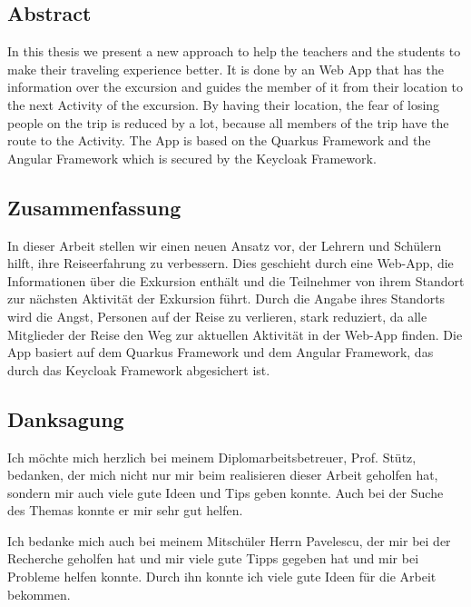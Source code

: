 \begin{spacing}{1}
    \chapter*{Abstract}
\end{spacing}
In this thesis we present a new approach to help the teachers and the students to make their traveling experience better. It is done by an Web App that has the information over the excursion and guides the member of it from their location to the next Activity of the excursion. By having their location, the fear of losing people on the trip is reduced by a lot, because all members of the trip have the route to the Activity. The App is based on the Quarkus Framework and the Angular Framework which is secured by the Keycloak Framework.  


\newpage
\begin{spacing}{1}
    \chapter*{Zusammenfassung}
\end{spacing}
In dieser Arbeit stellen wir einen neuen Ansatz vor, der Lehrern und Schülern hilft, ihre Reiseerfahrung zu verbessern. Dies geschieht durch eine Web-App, die Informationen über die Exkursion enthält und die Teilnehmer von ihrem Standort zur nächsten Aktivität der Exkursion führt. Durch die Angabe ihres Standorts wird die Angst, Personen auf der Reise zu verlieren, stark reduziert, da alle Mitglieder der Reise den Weg zur aktuellen Aktivität in der Web-App finden. Die App basiert auf dem Quarkus Framework und dem Angular Framework, das durch das Keycloak Framework abgesichert ist.

\newpage
\begin{spacing}{1}
    \chapter*{Danksagung}
\end{spacing}
Ich möchte mich herzlich bei meinem Diplomarbeitsbetreuer, Prof. Stütz, bedanken, der mich nicht nur mir beim realisieren dieser Arbeit geholfen hat, sondern mir auch viele gute Ideen und Tips geben konnte. Auch bei der Suche des Themas konnte er mir sehr gut helfen.

Ich bedanke mich auch bei meinem Mitschüler Herrn Pavelescu, der mir bei der Recherche geholfen hat und mir viele gute Tipps gegeben hat und mir bei Probleme helfen konnte. Durch ihn konnte ich viele gute Ideen für die Arbeit bekommen.
